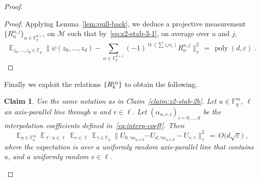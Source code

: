 \documentclass[11pt]{article}
\newtheorem{claim}[theorem]{Claim}
\theoremstyle{definition}
\DeclareMathOperator*{\Expectation}{\mathbb{E}}
\newcommand{\Es}[1]{\Expectation_{#1}}
\newcommand{\F}{\ensuremath{\mathbb{F}}}
\newcommand{\ld}{\textsc{ld}}
\newcommand{\mM}{\ensuremath{\mathcal{M}}}
\DeclareMathOperator{\poly}{poly}
\newcommand{\eps}{\varepsilon}
\DeclareMathOperator{\tr}{tr}
\begin{document}
\begin{proof}
\begin{proof}
Applying Lemma~\ref{lem:pull-back}, we deduce a projective measurement $\{R^{u,j}_\alpha\}_{\alpha\in \F_q^{d+1}}$  on $\mM$ such that by~\eqref{eq:z2-stab-3-1}, on average over $u$ and $j$,
\[  \Es{z_0,\ldots,z_{d}\in\F_q} \Big\| \psi(z_0,\ldots,z_{d}) -  \sum_{\alpha\in \F_q^{d+1}} (-1)^{\tr(\sum z_i\alpha_i)} R_\alpha^{u,j}\Big\|_\tau^2 \,=\, \poly(d,\eps)\;.\]
\end{proof}



Finally we exploit the relations $\{R^\ld_k\}$ to obtain the following. 

\begin{claim}\label{claim:z2-stab-5}
Use the same notation as in Claim~\ref{claim:z2-stab-2b}. Let $u\in \F_q^m$, $\ell$ an axis-parallel line through $u$ and $v\in\ell$. Let $(\alpha_{u,v,i})_{i=0,\ldots,d}$ be the interpolation coefficients defined in~\eqref{eq:interp-coeff}. %
Then 
\begin{equation}\label{eq:z2-stab-5-0}
\Es{u\in\F_q^m} \Es{\ell: u\in \ell} \Es{v\in \ell} \Es{\gamma\in\F_q} \Big\| U_{0,\gamma \alpha_{u,v,0}}\cdots U_{d,\gamma  \alpha_{u,v,d}} - U_{v,\gamma} \big\|_\tau^2 \,=\, O\big(d\sqrt{\eps}\big)\;,
\end{equation}
where the expectation is over a uniformly random axis-parallel line that contains $u$, and a uniformly random $v\in\ell$. 
\end{claim}


\end{proof}
\end{document}
